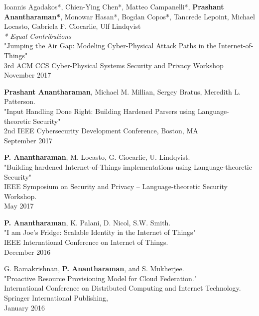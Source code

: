 \documentclass[letterpaper,10pt]{article}
\begin{document}
\begin{etaremune}
  \setlength\itemsep{0ex}

  \item Ioannis Agadakos*, Chien-Ying Chen*, Matteo Campanelli*, {\bf Prashant Anantharaman*}, Monowar Hasan*, Bogdan Copos*, Tancrede Lepoint, Michael Locasto, Gabriela F. Ciocarlie, Ulf Lindqvist \\
  		\textit{* Equal Contributions}\\
		"Jumping the Air Gap: Modeling Cyber-Physical Attack Paths in the Internet-of-Things" \\
		 3rd ACM CCS Cyber-Physical Systems Security and Privacy Workshop \\
		 November 2017
  \item {\bf Prashant Anantharaman}, Michael M. Millian, Sergey Bratus, Meredith L. Patterson.\\
  		"Input Handling Done Right: Building Hardened Parsers using Language-theoretic Security"\\
		 2nd IEEE Cybersecurity Development Conference, Boston, MA\\
		 September 2017
  
    \item {\bf P. Anantharaman}, M. Locasto, G. Ciocarlie, U. Lindqvist.\\
        "Building hardened Internet-of-Things implementations using Language-theoretic Security"\\
        IEEE Symposium on Security and Privacy -- Language-theoretic Security Workshop.\\
        May 2017
\item {\bf P. Anantharaman}, K. Palani, D. Nicol, S.W. Smith.\\
    "I am Joe's Fridge: Scalable Identity in the Internet of Things"\\
    IEEE International Conference on Internet of Things.\\
    December 2016
\item G. Ramakrishnan, {\bf P. Anantharaman}, and S. Mukherjee.\\
    "Proactive Resource Provisioning Model for Cloud Federation."\\
    International Conference on Distributed Computing and Internet Technology. Springer International Publishing,\\
    January 2016
\end{etaremune}

\end{document}
